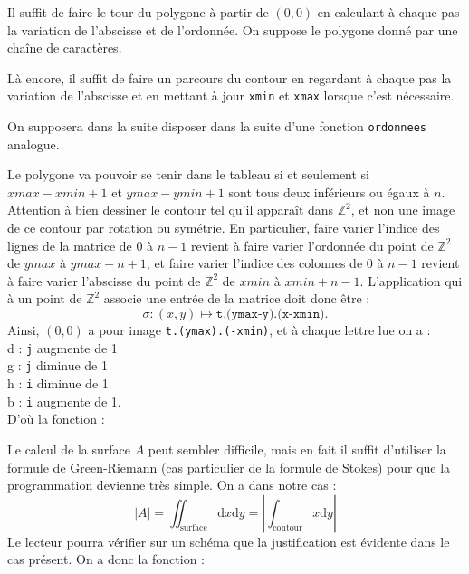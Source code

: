 \Corrige

\Q
Il suffit de faire le tour du polygone à partir de $(0,0)$ en calculant à chaque pas la variation de l'abscisse et de l'ordonnée. On suppose le polygone donné par une chaîne de caractères.



\Q
Là encore, il suffit de faire un parcours du contour en regardant à chaque pas la variation de l'abscisse et en mettant à jour \texttt{xmin} et \texttt{xmax} lorsque c'est nécessaire.
\newpage



On supposera dans la suite disposer dans la suite d'une fonction \texttt{ordonnees} analogue.

\Q
Le polygone va pouvoir se tenir dans le tableau si et seulement si $xmax - xmin + 1$ et $ymax - ymin + 1$ sont tous deux inférieurs ou égaux à $n$. Attention à bien dessiner le contour tel qu'il apparaît dans $\mathbb{Z}^2$, et non une image de ce contour par rotation ou symétrie. En particulier, faire varier l'indice des lignes de la matrice de 0 à $n-1$ revient à faire varier l'ordonnée du point de $\mathbb{Z}^2$ de $ymax$ à $ymax-n+1$, et faire varier l'indice des colonnes de 0 à $n-1$ revient à faire varier l'abscisse du point de $\mathbb{Z}^2$ de $xmin$ à $xmin+n-1$. L'application qui à un point de $\mathbb{Z}^2$ associe une entrée de la matrice doit donc être :
\[
    \sigma : (x,y) \mapsto \texttt{t.(ymax-y).(x-xmin)}.
\]
Ainsi, $(0,0)$ a pour image \texttt{t.(ymax).(-xmin)}, et à chaque lettre lue on a :\\
\og d \fg{} : \texttt{j} augmente de 1\\
\og g \fg{} : \texttt{j} diminue de 1\\
\og h \fg{} : \texttt{i} diminue de 1\\
\og b \fg{} : \texttt{i} augmente de 1.\\
D'où la fonction :



\Q
Le calcul de la surface $A$ peut sembler difficile, mais en fait il suffit d'utiliser la formule de Green-Riemann (cas particulier de la formule de Stokes) pour que la programmation devienne très simple. On a dans notre cas :
\[
    |A| = \iint_{\textrm{surface}}\textrm{d}x\textrm{d}y = \left|\int_{\textrm{contour}}x\textrm{d}y\right|
\]
Le lecteur pourra vérifier sur un schéma que la justification est évidente dans le cas présent. On a donc la fonction :

